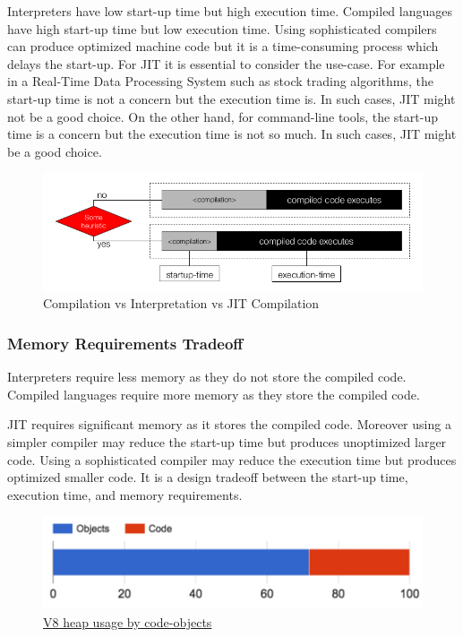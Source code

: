 \documentclass[11pt,paper=a4,answers]{exam}
\begin{document}
Interpreters have low start-up time but high execution time. Compiled languages have high start-up time but low execution time. Using sophisticated compilers can produce optimized machine code but it is a time-consuming process which delays the start-up. For JIT it is essential to consider the use-case. For example in a Real-Time Data Processing System such as stock trading algorithms, the start-up time is not a concern but the execution time is. In such cases, JIT might not be a good choice. On the other hand, for command-line tools, the start-up time is a concern but the execution time is not so much. In such cases, JIT might be a good choice.
\begin{figure}[h]
    \centering
    \includegraphics[scale=0.49]{Extras/STARTUP_VS_EXECUTION.png}
    \caption{Compilation vs Interpretation vs JIT Compilation}
    \label{fig:your_label}
\end{figure}
\subsubsection{Memory Requirements Tradeoff}
Interpreters require less memory as they do not store the compiled code. Compiled languages require more memory as they store the compiled code.

JIT requires significant memory as it stores the compiled code. Moreover using a simpler compiler may reduce the start-up time but produces unoptimized larger code. Using a sophisticated compiler may reduce the execution time but produces optimized smaller code. It is a design tradeoff between the start-up time, execution time, and memory requirements.
\begin{figure}[h]
    \centering
    \includegraphics[scale=0.26]{Extras/V8_HEAP.png}
    \caption{\href{https://docs.google.com/presentation/d/1chhN90uB8yPaIhx_h2M3lPyxPgdPmkADqSNAoXYQiVE/edit?usp=sharing}{V8 heap usage by code-objects}}
    \label{fig:your_label}
\end{figure}
\end{document}
